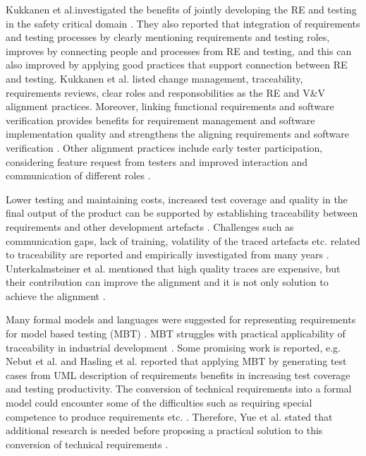\documentclass{article}
\begin{document}
Kukkanen et al.investigated the benefits of jointly developing the RE and testing in the safety critical domain \cite{kukkanen2009applying}. They also reported that integration of requirements and testing processes by clearly mentioning requirements and testing roles, improves by connecting people and processes from RE and testing, and this can also improved by applying good practices that support connection between RE and testing. Kukkanen et al. listed change management, traceability, requirements reviews, clear roles and responsobilities as the RE and V\&V alignment practices. Moreover, linking functional requirements and software verification provides benefits for requirement management and software implementation quality and strengthens the aligning requirements and software verification \cite{post2009linkingS4}. Other alignment practices include early tester participation, considering feature request from testers and improved interaction and communication of different roles \cite{uusitalo2008linkingS5}.

Lower testing and maintaining costs, increased test coverage and quality in the final output of the product can be supported by establishing traceability between requirements and other development artefacts \cite{kukkanen2009applying,uusitalo2008linkingS5,watkins1994and}. Challenges such as communication gaps, lack of training, volatility of the traced artefacts etc. related to traceability are reported  and empirically investigated from many years  \cite{bjarnason2014challengesS9,cleland2003event}. Unterkalmsteiner et al. mentioned that high quality traces are expensive, but their contribution can improve the alignment and it is not only solution to achieve the alignment \cite{unterkalmsteiner2014taxonomyS10}.

Many formal models and languages were suggested for representing requirements for model based testing (MBT) \cite{dias2007survey}. MBT struggles with practical applicability of traceability in industrial development \cite{nebut2006automatic,yue2011systematic,aichernig2014integration}. Some promising work is reported, e.g. Nebut et al. \cite{nebut2006automatic} and Hasling et al. \cite{hasling2008model} reported that applying MBT by generating test cases from UML description of requirements benefits in increasing test coverage and testing productivity. The conversion of technical requirements into a formal model could encounter some of the difficulties such as requiring special competence to produce requirements etc. \cite{nebut2006automatic}. Therefore, Yue et al. stated that additional research is needed before proposing a practical solution to this conversion of technical requirements \cite{yue2011systematic}. 
\end{document}
